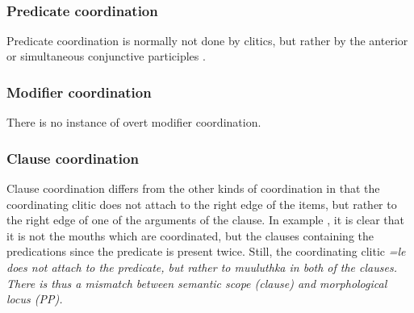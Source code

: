 \\ 


\subsubsection{Predicate coordination}\label{sec:constr:Predicatecoordination}
Predicate coordination is normally not done by clitics, but rather by the anterior or simultaneous conjunctive participles .

\subsubsection{Modifier coordination}\label{sec:constr:Modifiercoordination}
There is no instance of overt modifier coordination.

\subsubsection{Clause coordination}\label{sec:constr:Clausecoordination}
Clause coordination differs from the other kinds of coordination in that the coordinating clitic does not attach to the right edge of the items, but rather to the right edge of one of the arguments of the clause. In example , it is clear that it is not the mouths which are coordinated, but the clauses containing the predications since the predicate  is present twice. Still, the coordinating clitic \em =le \em does not attach to the predicate, but rather to \em muuluthka \em in both of the clauses. There is thus a mismatch between semantic scope (clause) and morphological locus (PP).

\\ 

